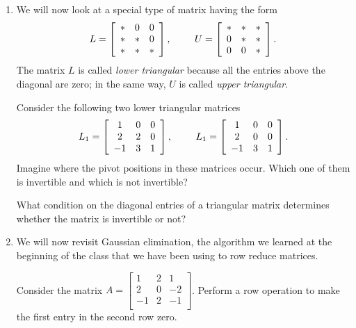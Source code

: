 \documentclass[12pt]{article}
\newcommand{\vs}[1]{\vspace{#1in}}
\begin{document}
\begin{enumerate}
  \vs{1}
\item We will now look at a special type of matrix having the form
  $$
  L =
  \left[
    \begin{array}{ccc}
      * & 0 & 0 \\
      * & * & 0 \\
      * & * & * \\
    \end{array}
  \right],\hspace*{24pt}
  U =
  \left[
    \begin{array}{ccc}
      * & * & * \\
      0 & * & * \\
      0 & 0 & * \\
    \end{array}
  \right].
  $$
  The matrix $L$ is called {\em lower triangular} because all the
  entries above the diagonal are zero;  in the same way, $U$ is called
  {\em upper triangular}.

  Consider the following two lower triangular matrices
  $$
  L_1 =
  \left[
    \begin{array}{ccc}
      1 & 0 & 0 \\
      2 & 2 & 0 \\
      -1 & 3 & 1 \\
    \end{array}
  \right],\hspace*{24pt}
  L_1 =
  \left[
    \begin{array}{ccc}
      1 & 0 & 0 \\
      2 & 0 & 0 \\
      -1 & 3 & 1 \\
    \end{array}
  \right].
  $$
  \newpage
  Imagine where the pivot positions in these matrices occur.  Which
  one of them is invertible and which is not invertible?

  \vs{1}
  What condition on the diagonal entries of a triangular matrix
  determines whether the matrix is invertible or not?

  \vs{1}
\item We will now revisit Gaussian elimination, the algorithm we
  learned at the beginning of the class that we have been using to row
  reduce matrices.

  Consider the matrix
  $
  A = 
  \left[
    \begin{array}{ccc}
      1 & 2 & 1 \\
      2 & 0 & -2 \\
      -1 & 2 & -1 \\
    \end{array}
  \right]
  $.
  Perform a row operation to make the first
  entry in the second row zero.


\end{enumerate}
\end{document}

